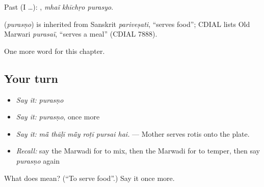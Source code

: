 Past (I …):   , \emph{mhaĩ khīchṛo purasyo}.

\begin{cousinweb}
\textbf{} (\emph{purasṇo}) is inherited from Sanskrit \emph{pariveṣati}, \textquotedblleft{}serves food\textquotedblright{}; CDIAL lists Old Marwari \emph{purasaï}, \textquotedblleft{}serves a meal\textquotedblright{} (CDIAL 7888).
\end{cousinweb}

\begin{grammarlens}[title={What you've built}]
One more word for this chapter.
\end{grammarlens}

\subsection*{Your turn}
\begin{itemize}
\raggedright
  \item \emph{Say it:} \emph{purasṇo}
  \item \emph{Say it:} \emph{purasṇo}, once more
  \item \emph{Say it:} \emph{mā̃ thāḷī mā̃y roṭī pursai hai.} — Mother serves rotis onto the plate.
  \item \emph{Recall:} say the Marwadi for to mix, then the Marwadi for to temper, then say \emph{purasṇo} again
\end{itemize}

\begin{tcolorbox}[breakable,colback=teal!4,colframe=teal!35!black,title={Before you move on}]
What does  mean? (\textquotedblleft{}To serve food\textquotedblright{}.) Say it once more.
\end{tcolorbox}
